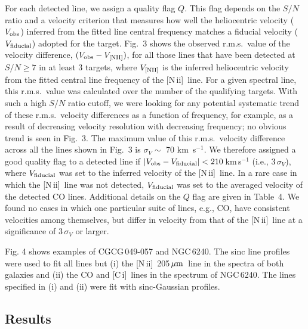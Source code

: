 \documentclass[preprint]{aastex}
\newcommand{\um}{\mbox{$\,\mu{\rm m}$}}
\newcommand{\kms}{\mbox{\,km~s$^{-1}$}}
\newcommand{\CI}{[C\,{\sc i}]}
\newcommand{\NII}{\mbox{[N\,{\sc ii}]}}
\begin{document}
For each detected line, we assign a quality flag $Q$.  This flag depends on 
the $S/N$ ratio and a velocity
criterion that measures how well the heliocentric velocity ($V_{\rm obs}$) inferred
from the fitted line central frequency matches a fiducial velocity ($V_{\rm fiducial}$)
adopted for the target.   Fig.~3 shows the observed r.m.s.~value of the velocity
difference, $(V_{\rm obs} - V_{\rm [NII]})$, for all those lines that have been
detected at $S/N \geqslant 7$ in at least 3 targets, where $V_{\rm [NII]}$
is the inferred heliocentric velocity from the fitted central line frequency 
of the \NII\ line.  For a given spectral line, this r.m.s.~value was calculated over 
the number of the qualifying targets.  With such a high $S/N$ ratio cutoff, we were 
looking for any potential systematic trend of these r.m.s.~velocity differences as 
a function of frequency, for example, as a result of decreasing velocity resolution
with decreasing frequency; no obvious trend is seen in Fig.~3.
The maximum value of this r.m.s.~velocity difference
across all the lines shown in Fig.~3 is $\sigma_V \sim$ 70\,\kms.  We therefore 
assigned a good quality flag to a detected line if $|V_{\rm obs} - V_{\rm fiducial}|
< 210$\,km\,s$^{-1}$ (i.e., $3\,\sigma_V$), where $V_{\rm fiducial}$ was set to 
the inferred velocity of the \NII\ line. In a rare case in which the \NII\ line was not detected, 
$V_{\rm fiducial}$ was set to the averaged velocity of the detected CO lines. 
Additional details on the $Q$ flag are given in Table~4.  We found no cases in 
which one particular suite of lines, e.g., CO, have consistent velocities among 
themselves, but differ in velocity from that of the \NII\ line at a significance 
of 3\,$\sigma_V$ or larger.




Fig. 4 shows examples of CGCG\,049-057 and NGC\,6240. The sinc line profiles were 
used to fit all lines but (i) the \NII\ 205\um\ line in the spectra of both galaxies
and (ii) the CO and \CI\ lines in the spectrum of NGC\,6240.  The lines specified 
in (i) and (ii) were fit with sinc-Gaussian profiles.




\subsection{Results} \label{sec3.5}
\end{document}
